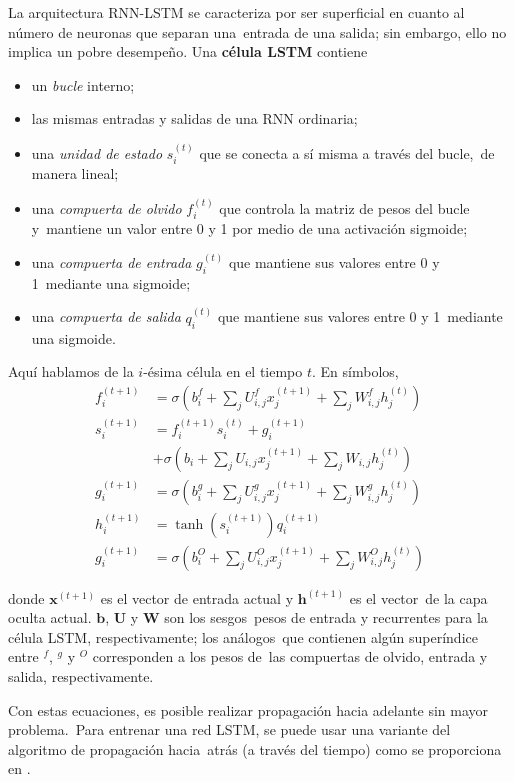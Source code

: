 La arquitectura RNN-LSTM se caracteriza por ser superficial en cuanto al número de neuronas que separan una\
entrada de una salida; sin embargo, ello no implica un pobre desempeño. Una \textbf{célula LSTM} contiene\
\begin{itemize}
\item un \emph{bucle} interno;
\item las mismas entradas y salidas de una RNN ordinaria;
\item una \emph{unidad de estado} $s_i^{(t)}$ que se conecta a sí misma a través del bucle,\
  de manera lineal;
\item una \emph{compuerta de olvido} $f_i^{(t)}$ que controla la matriz de pesos del bucle y\
  mantiene un valor entre 0 y 1 por medio de una activación sigmoide;
\item una \emph{compuerta de entrada} $g_i^{(t)}$ que mantiene sus valores entre 0 y 1\
  mediante una sigmoide;
\item una \emph{compuerta de salida} $q_i^{(t)}$ que mantiene sus valores entre 0 y 1\
  mediante una sigmoide.
\end{itemize}\par
Aquí hablamos de la $i$-ésima célula en el tiempo $t$. En símbolos,
\begin{align}
  f_i^{(t+1)} &= \sigma\left(b_i^f + \sum_j U_{i,j}^f x_j^{(t+1)} + \sum_j W_{i,j}^f h_j^{(t)}\right)\\
  s_i^{(t+1)} &= f_i^{(t+1)} s_i^{(t)} + g_i^{(t+1)} \nonumber \\
  &+ \sigma\left(b_i + \sum_j U_{i,j} x_j^{(t+1)} + \sum_j W_{i,j} h_j^{(t)}\right)\\
  g_i^{(t+1)} &= \sigma\left(b_i^g + \sum_j U_{i,j}^g x_j^{(t+1)} + \sum_j W_{i,j}^g h_j^{(t)}\right)\\
  h_i^{(t+1)} &= \tanh(s_i^{(t+1)}) q_i^{(t+1)}\\
  g_i^{(t+1)} &= \sigma\left(b_i^O + \sum_j U_{i,j}^O x_j^{(t+1)} + \sum_j W_{i,j}^O h_j^{(t)}\right)
\end{align}\par
donde $\mathbf{x}^{(t+1)}$ es el vector de entrada actual y $\mathbf{h}^{(t+1)}$ es el vector\
de la capa oculta actual. $\mathbf{b}$, $\mathbf{U}$ y $\mathbf{W}$ son los sesgos\
pesos de entrada y recurrentes para la célula LSTM, respectivamente; los análogos\
que contienen algún superíndice entre $^f$, $^g$ y $^O$ corresponden a los pesos de\
las compuertas de olvido, entrada y salida, respectivamente.\par
Con estas ecuaciones, es posible realizar propagación hacia adelante sin mayor problema.\
Para entrenar una red LSTM, se puede usar una variante del algoritmo de propagación hacia\
atrás (a través del tiempo) como se proporciona en \cite{hochreiter1997}.
